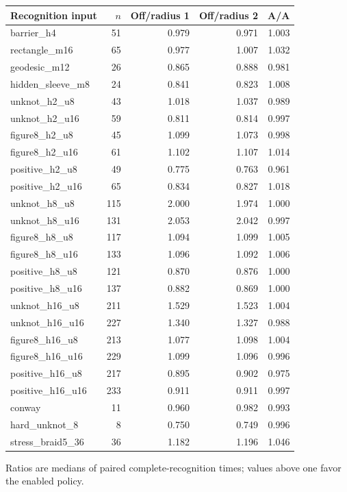\begin{center}
\begin{tabular}{@{}lrrrr@{}}
\toprule
Recognition input & $n$ & Off/radius 1 & Off/radius 2 & A/A \\
\midrule
barrier\_h4 & 51 & 0.979 & 0.971 & 1.003 \\
rectangle\_m16 & 65 & 0.977 & 1.007 & 1.032 \\
geodesic\_m12 & 26 & 0.865 & 0.888 & 0.981 \\
hidden\_sleeve\_m8 & 24 & 0.841 & 0.823 & 1.008 \\
unknot\_h2\_u8 & 43 & 1.018 & 1.037 & 0.989 \\
unknot\_h2\_u16 & 59 & 0.811 & 0.814 & 0.997 \\
figure8\_h2\_u8 & 45 & 1.099 & 1.073 & 0.998 \\
figure8\_h2\_u16 & 61 & 1.102 & 1.107 & 1.014 \\
positive\_h2\_u8 & 49 & 0.775 & 0.763 & 0.961 \\
positive\_h2\_u16 & 65 & 0.834 & 0.827 & 1.018 \\
unknot\_h8\_u8 & 115 & 2.000 & 1.974 & 1.000 \\
unknot\_h8\_u16 & 131 & 2.053 & 2.042 & 0.997 \\
figure8\_h8\_u8 & 117 & 1.094 & 1.099 & 1.005 \\
figure8\_h8\_u16 & 133 & 1.096 & 1.092 & 1.006 \\
positive\_h8\_u8 & 121 & 0.870 & 0.876 & 1.000 \\
positive\_h8\_u16 & 137 & 0.882 & 0.869 & 1.000 \\
unknot\_h16\_u8 & 211 & 1.529 & 1.523 & 1.004 \\
unknot\_h16\_u16 & 227 & 1.340 & 1.327 & 0.988 \\
figure8\_h16\_u8 & 213 & 1.077 & 1.098 & 1.004 \\
figure8\_h16\_u16 & 229 & 1.099 & 1.096 & 0.996 \\
positive\_h16\_u8 & 217 & 0.895 & 0.902 & 0.975 \\
positive\_h16\_u16 & 233 & 0.911 & 0.911 & 0.997 \\
conway & 11 & 0.960 & 0.982 & 0.993 \\
hard\_unknot\_8 & 8 & 0.750 & 0.749 & 0.996 \\
stress\_braid5\_36 & 36 & 1.182 & 1.196 & 1.046 \\
\bottomrule
\end{tabular}
\end{center}
Ratios are medians of paired complete-recognition times; values above one favor the enabled policy.
